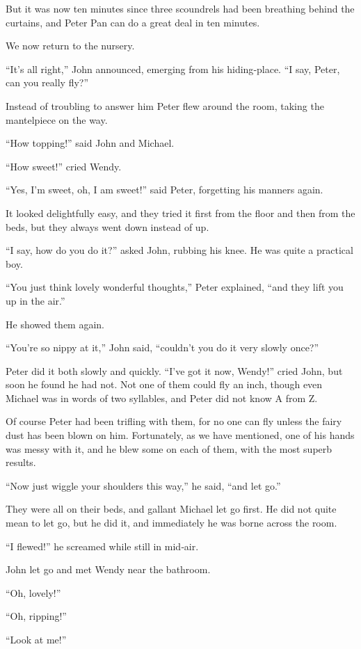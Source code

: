 But it was now ten minutes since three scoundrels had been breathing behind the curtains,
and Peter Pan can do a great deal in ten minutes.

We now return to the nursery.

“It’s all right,” John announced, emerging from his hiding‐place.
“I say, Peter, can you really fly?”

Instead of troubling to answer him Peter flew around the room, taking the mantelpiece on the way.

“How topping!\@” said John and Michael.

“How sweet!\@” cried Wendy.

“Yes, I’m sweet, oh, I am sweet!\@” said Peter, forgetting his manners again.

It looked delightfully easy, and they tried it first from the floor and then from the beds,
but they always went down instead of up.

“I say, how do you do it?\@” asked John, rubbing his knee.
He was quite a practical boy.

“You just think lovely wonderful thoughts,” Peter explained, “and they lift you up in the air.”

He showed them again.

“You’re so nippy at it,” John said, “couldn’t you do it very slowly once?”

Peter did it both slowly and quickly.
“I’ve got it now, Wendy!\@” cried John, but soon he found he had not.
Not one of them could fly an inch,
though even Michael was in words of two syllables, and Peter did not know A from Z\@.

Of course Peter had been trifling with them,
for no one can fly unless the fairy dust has been blown on him.
Fortunately, as we have mentioned, one of his hands was messy with it,
and he blew some on each of them, with the most superb results.

“Now just wiggle your shoulders this way,” he said, “and let go.”

They were all on their beds, and gallant Michael let go first.
He did not quite mean to let go, but he did it,
and immediately he was borne across the room.

“I flewed!\@” he screamed while still in mid‐air.

John let go and met Wendy near the bathroom.

“Oh, lovely!”

“Oh, ripping!”

“Look at me!”

